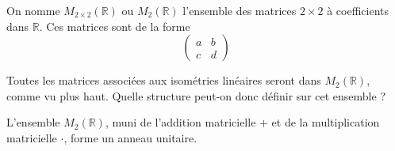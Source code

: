 \documentclass{book}
\numberwithin{equation}{section}
\providecommand{\MR}{{M_2(\mathbb R)}}
\begin{document}
\begin{defn}
	On nomme $M_{2 \times 2}(\mathbb R)$ ou $\MR$ l'ensemble des matrices $2 \times 2$ à coefficients dans $\mathbb R$. Ces matrices sont de la forme
	\begin{equation*}
		\begin{pmatrix}
			a & b\\
			c & d
		\end{pmatrix}
	\end{equation*}
\end{defn}
Toutes les matrices associées aux isométries linéaires seront dans $\MR$, comme vu plus haut. Quelle structure peut-on donc définir sur cet ensemble ?

\begin{prop}
	L'ensemble $\MR$, muni de l'addition matricielle $+$ et de la multiplication matricielle $\cdot$, forme un anneau unitaire.
\end{prop}
\end{document}

